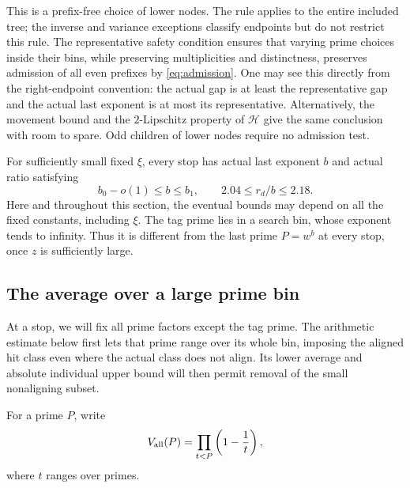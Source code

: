 This is a prefix-free choice of lower nodes.  The rule applies to the
entire included tree; the inverse and variance exceptions classify
endpoints but do not restrict this rule.
The representative safety
condition ensures that varying prime choices inside their bins, while
preserving multiplicities and distinctness, preserves admission of all
even prefixes by \eqref{eq:admission}.  One may see this directly from
the right-endpoint convention: the actual gap is at least the
representative gap and the actual last exponent is at most its
representative.  Alternatively, the movement bound and the
$2$-Lipschitz property of $\mathcal H$ give the same conclusion with room to
spare.  Odd children of lower nodes require no admission test.

For sufficiently small fixed $\xi$, every stop has actual last
exponent $b$ and actual ratio satisfying
\begin{equation}\label{eq:stops-actual-window}
 b_0-o(1)\le b\le b_1,
 \qquad 2.04\le r_d/b\le2.18.
\end{equation}
Here and throughout this section, the eventual bounds may depend on all
the fixed constants, including $\xi$.  The tag prime lies in a search
bin, whose exponent tends to infinity.  Thus it is different from the
last prime $P=w^b$ at every stop, once $z$ is sufficiently large.

\subsection{The average over a large prime bin}

At a stop, we will fix all prime factors except the tag prime.  The
arithmetic estimate below first lets that prime range over its whole
bin, imposing the aligned hit class even where the actual class does
not align.  Its lower average and absolute individual upper bound will
then permit removal of the small nonaligning subset.

For a prime $P$, write
\[
 V_{\rm all}(P)=\prod_{t<P}\left(1-\frac1t\right),
\]
where $t$ ranges over primes.

